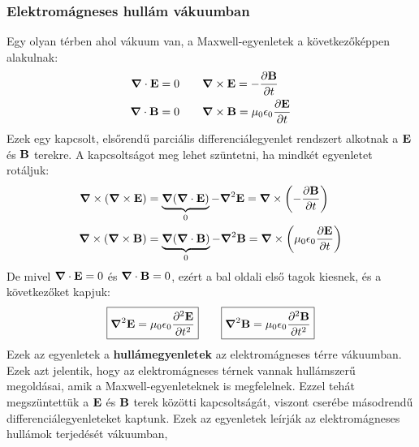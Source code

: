 \documentclass[../main.tex]{subfiles}
\begin{document}
\subsubsection{Elektromágneses hullám vákuumban}
Egy olyan térben ahol vákuum van, a Maxwell-egyenletek a következőképpen alakulnak:
\begin{equation}
    \begin{aligned}
        \boldsymbol{\nabla} \cdot \bold{E} &= 0 \qquad \boldsymbol{\nabla} \times \bold{E} = -\frac{\partial \bold{B}}{\partial t} \\
        \boldsymbol{\nabla} \cdot \bold{B} &= 0 \qquad \boldsymbol{\nabla} \times \bold{B} = \mu_0 \epsilon_0 \frac{\partial \bold{E}}{\partial t} 
    \end{aligned}
\end{equation}
Ezek egy kapcsolt, elsőrendű parciális differenciálegyenlet rendszert alkotnak a $\bold{E}$ és $\bold{B}$ terekre. A kapcsoltságot meg lehet szüntetni, ha mindkét egyenletet rotáljuk:
\begin{equation}
    \begin{aligned}
        \boldsymbol{\nabla} \times (\boldsymbol{\nabla} \times \bold{E}) &= \underbrace{\boldsymbol{\nabla} (\boldsymbol{\nabla} \cdot \bold{E})}_{0} - \boldsymbol{\nabla}^2 \bold{E} = \boldsymbol{\nabla} \times \left(-\frac{\partial \bold{B}}{\partial t}\right) \\
        \boldsymbol{\nabla} \times (\boldsymbol{\nabla} \times \bold{B}) &= \underbrace{\boldsymbol{\nabla} (\boldsymbol{\nabla} \cdot \bold{B})}_{0} - \boldsymbol{\nabla}^2 \bold{B} = \boldsymbol{\nabla} \times \left( \mu_0 \epsilon_0 \frac{\partial \bold{E}}{\partial t} \right) \\
    \end{aligned}
\end{equation}
De mivel $\boldsymbol{\nabla} \cdot \bold{E} = 0$ és $\boldsymbol{\nabla} \cdot \bold{B} = 0$, ezért a bal oldali első tagok kiesnek, és a következőket kapjuk:
\begin{equation}
    \boxed{\boldsymbol{\nabla}^2 \bold{E} = \mu_0 \epsilon_0 \frac{\partial^2 \bold{E}}{\partial t^2}} \qquad \boxed{\boldsymbol{\nabla}^2 \bold{B} = \mu_0 \epsilon_0 \frac{\partial^2 \bold{B}}{\partial t^2}}
\end{equation}
Ezek az egyenletek a \textbf{hullámegyenletek} az elektromágneses térre vákuumban. Ezek azt jelentik, hogy az elektromágneses térnek vannak hullámszerű megoldásai, amik a Maxwell-egyenleteknek is megfelelnek.
Ezzel tehát megszüntettük a $\bold{E}$ és $\bold{B}$ terek közötti kapcsoltságát, viszont cserébe másodrendű differenciálegyenleteket kaptunk. Ezek az egyenletek leírják az elektromágneses hullámok terjedését vákuumban,
\end{document}
